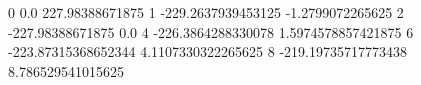 0 0.0 227.98388671875
1 -229.2637939453125 -1.2799072265625
2 -227.98388671875 0.0
4 -226.3864288330078 1.5974578857421875
6 -223.87315368652344 4.1107330322265625
8 -219.19735717773438 8.786529541015625
